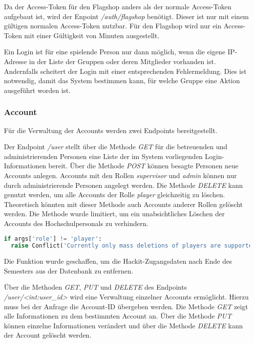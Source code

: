 Da der Access-Token für den Flagshop anders als der normale Access-Token aufgebaut ist, wird der Enpoint \textit{/auth/flagshop} benötigt. Dieser ist nur mit einem gültigen normalen Access-Token nutzbar. Für den Flagshop wird nur ein Access-Token mit einer Gültigkeit von  Minuten ausgestellt.

Ein Login ist für eine spielende Person nur dann möglich, wenn die eigene IP-Adresse in der Liste der Gruppen oder deren Mitglieder vorhanden ist. Andernfalls scheitert der Login mit einer entsprechenden Fehlermeldung. Dies ist notwendig, damit das System bestimmen kann, für welche Gruppe eine Aktion ausgeführt worden ist.

\subsubsection{Account}
Für die Verwaltung der Accounts werden zwei Endpoints bereitgestellt. 

Der Endpoint \textit{/user} stellt über die Methode \textit{GET} für die betreuenden und administrierenden Personen eine Liste der im System vorliegenden Login-Informationen bereit. Über die Methode \textit{POST} können besagte Personen neue Accounts anlegen. Accounts mit den Rollen \textit{supervisor} und \textit{admin} können nur durch administrierende Personen angelegt werden. Die Methode \textit{DELETE} kann genutzt werden, um alle Accounts der Rolle \textit{player} gleichzeitig zu löschen. Theoretisch könnten mit dieser Methode auch Accounts anderer Rollen gelöscht werden. Die Methode wurde limitiert, um ein unabsichtliches Löschen der Accounts des \linebreak Hochschulpersonals zu verhindern.

\begin{lstlisting}[language=Python, frame=single, caption={GIS Löschen auf player-Accounts begrenzen}, captionpos=b, label={lst:gis-delete-all-players}]
if args['role'] != 'player':
  raise Conflict('Currently only mass deletions of players are supported.')
\end{lstlisting}

Die Funktion wurde geschaffen, um die Hackit-Zugangsdaten nach Ende des Semesters aus der Datenbank zu entfernen.

Über die Methoden \textit{GET}, \textit{PUT} und \textit{DELETE} des Endpoints \textit{/user/<int:user\_id>} wird eine Verwaltung einzelner Accounts ermöglicht. Hierzu muss bei der Anfrage die Account-ID übergeben werden. Die Methode \textit{GET} zeigt alle Informationen zu dem bestimmten Account an. Über die Methode \textit{PUT} können einzelne Informationen verändert und über die Methode \textit{DELETE} kann der Account gelöscht werden.

